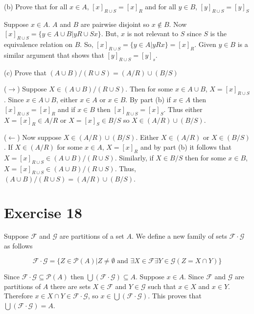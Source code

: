 \documentclass[11pt]{article}
\newcommand{\powerset}[1]{\mathscr{P}(#1)}
\newcommand{\family}[1]{\mathcal{#1}}
\begin{document}
\noindent (b) Prove that for all $x \in A$, $[x]_{R \cup S} = [x]_R$ and for all 
$y \in B$, $[y]_{R \cup S} = [y]_S$

Suppose $x \in A$. $A$ and $B$ are pairwise disjoint so $x \notin B$. Now 
$[x]_{R \cup S} = \{y \in A \cup B | y R \cup S x\}$. But, $x$ is not relevant to 
$S$ since $S$ is the equivalence relation on $B$. So, 
$[x]_{R \cup S} = \{y \in A | yRx\} = [x]_R$. Given $y \in B$ is a similar argument 
that shows that $[y]_{R \cup S} = [y]_s$.

\noindent (c) Prove that $(A \cup B) / (R \cup S) = (A / R) \cup (B / S)$

($\rightarrow$) Suppose $X \in (A \cup B) / (R \cup S)$. Then for some 
$x \in A \cup B$, $X = [x]_{R \cup S}$. Since $x \in A \cup B$, either 
$x \in A$ or $x \in B$. By part (b) if $x \in A$ then $[x]_{R \cup S} = [x]_R$
and if $x \in B$ then $[x]_{R \cup S} = [x]_S$. Thus either $X = [x]_R \in A /R$
or $X = [x]_S \in B/S$ so $X \in (A/R) \cup (B/S)$.

($\leftarrow$) Now suppose $X \in (A/R) \cup (B/S)$. Either $X \in (A/R)$ or 
$X \in (B/S)$. If $X \in (A/R)$ for some $x \in A$, $X = [x]_R$ and by part (b)
it follows that $X = [x]_{R \cup S} \in (A \cup B) / (R \cup S)$. Similarly,
if $X \in B/S$ then for some $x \in B$, $X = [x]_{R \cup S} \in (A \cup B)/(R \cup S)$.
Thus, $(A \cup B)/(R \cup S) = (A/R) \cup (B/S)$.

\section*{Exercise 18}

Suppose $\family{F}$ and $\family{G}$ are partitions of a set $A$. We define a 
new family of sets $\family{F} \cdot \family{G}$ as follows

$$\family{F} \cdot \family{G} = \{Z \in \powerset{A} | Z \neq \emptyset 
\text{ and } \exists X \in \family{F} \exists Y \in \family{G} (Z = X \cap Y)\}$$

Since $\family{F} \cdot \family{G} \subseteq \powerset{A}$ then 
$\bigcup (\family{F} \cdot \family{G}) \subseteq A$. Suppose $x \in A$. Since 
$\family{F}$ and $\family{G}$ are partitions of $A$ there are sets $X \in \family{F}$
and $Y \in \family{G}$ such that $x \in X$ and $x \in Y$. Therefore 
$x \in X \cap Y \in \family{F} \cdot \family{G}$, so 
$x \in \bigcup (\family{F} \cdot \family{G})$. This proves that 
$\bigcup (\family{F} \cdot \family{G}) = A$.
\end{document}
